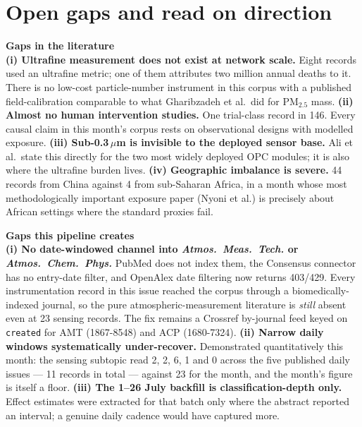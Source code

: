 \documentclass[10pt]{article}
\begin{document}
\section*{\sffamily\bfseries\color{Deep}Open gaps and read on direction}
\vspace{-1.5mm}{\color{Coral}\rule{\linewidth}{1.1pt}}\vspace{2.5mm}

\begin{keybox}
{\sffamily\bfseries\footnotesize\color{Deep}Gaps in the literature}\\[1.2mm]
\footnotesize
\textbf{(i) Ultrafine measurement does not exist at network scale.} Eight records used an
ultrafine metric; one of them attributes two million annual deaths to it. There is no
low-cost particle-number instrument in this corpus with a published field-calibration
comparable to what Gharibzadeh et al.\ did for PM$_{2.5}$ mass.
\textbf{(ii) Almost no human intervention studies.} One trial-class record in 146.
Every causal claim in this month's corpus rests on observational designs with
modelled exposure.
\textbf{(iii) Sub-0.3\,$\mu$m is invisible to the deployed sensor base.} Ali et al.\
state this directly for the two most widely deployed OPC modules; it is also where the
ultrafine burden lives.
\textbf{(iv) Geographic imbalance is severe.} 44 records from China against 4 from
sub-Saharan Africa, in a month whose most methodologically important exposure paper
(Nyoni et al.) is precisely about African settings where the standard proxies fail.
\end{keybox}

\vspace{2.5mm}

\begin{keybox}
{\sffamily\bfseries\footnotesize\color{Deep}Gaps this pipeline creates}\\[1.2mm]
\footnotesize
\textbf{(i) No date-windowed channel into \textit{Atmos.\ Meas.\ Tech.} or
\textit{Atmos.\ Chem.\ Phys.}} PubMed does not index them, the Consensus connector has
no entry-date filter, and OpenAlex date filtering now returns 403/429. Every
instrumentation record in this issue reached the corpus through a
biomedically-indexed journal, so the pure atmospheric-measurement literature is
\emph{still} absent even at 23 sensing records. The fix remains a Crossref by-journal
feed keyed on \texttt{created} for AMT (1867-8548) and ACP (1680-7324).
\textbf{(ii) Narrow daily windows systematically under-recover.} Demonstrated
quantitatively this month: the sensing subtopic read 2, 2, 6, 1 and 0 across the five
published daily issues --- 11 records in total --- against 23 for the month, and the
month's figure is itself a floor.
\textbf{(iii) The 1--26 July backfill is classification-depth only.} Effect estimates
were extracted for that batch only where the abstract reported an interval; a genuine
daily cadence would have captured more.
\end{keybox}
\end{document}
